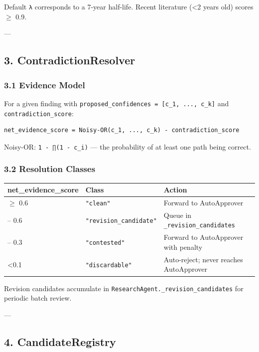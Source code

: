 Default \texttt{λ} corresponds to a 7-year half-life. Recent literature (\textless  2 years old) scores $\ge$ 0.9.

---

\subsection{3. Contra\-dictionResolver}

\subsubsection{3.1 Evidence Model}

For a given finding with \texttt{proposed\_confidences = [c\_1, ..., c\_k]} and \texttt{contradiction\_score}:

\begin{lstlisting}
net_evidence_score = Noisy-OR(c_1, ..., c_k) - contradiction_score
\end{lstlisting}

Noisy-OR: \texttt{1 - ∏(1 - c\_i)} — the probability of at least one path being correct.

\subsubsection{3.2 Resolution Classes}

\begin{center}
{\footnotesize
\begin{tabularx}{\columnwidth}{|>{\raggedright\arraybackslash}X|>{\raggedright\arraybackslash}X|>{\raggedright\arraybackslash}X|}
\hline
net\_evidence\_score & Class & Action \\ \hline
$\ge$ 0.6 & \texttt{"clean"} & Forward to AutoApprover \\ \hline
0.3 – 0.6 & \texttt{"revision\_candidate"} & Queue in \texttt{\_revision\_candidates} \\ \hline
0.1 – 0.3 & \texttt{"contested"} & Forward to AutoApprover with penalty \\ \hline
\textless  0.1 & \texttt{"discardable"} & Auto-reject; never reaches AutoApprover \\ \hline
\end{tabularx}
}
\end{center}

Revision candidates accumulate in \texttt{ResearchAgent.\_revision\_candidates} for periodic batch review.

---

\subsection{4. CandidateRegistry}

